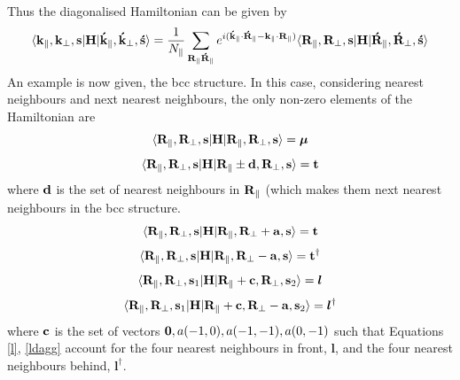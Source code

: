 \documentclass[a4paper, 12pt]{article}
\begin{document}
	Thus the diagonalised Hamiltonian can be given by 
	\begin{equation}
		\langle{\bf k}_\parallel, {\bf k}_\perp, {\bf s}|{\bf H}|{\bf \acute{k}}_\parallel, {\bf \acute{k}}_\perp, {\bf \acute{s}}\rangle = \frac{1}{N_\parallel}\sum_{\bf R_\parallel \acute{R}_\parallel}  e^{i({\bf \acute{k}}_\parallel\cdot {\bf \acute{R}}_\parallel-{\bf k}_\parallel\cdot {\bf R}_\parallel)} \langle{\bf R}_\parallel,{\bf R}_\perp, {\bf s}|{\bf H}|{\bf \acute{R}}_\parallel,{\bf \acute{R}}_\perp, {\bf \acute{s}} \rangle
	\end{equation}
	An example is now given, the \gls{bcc} structure. In this case, considering nearest neighbours and next nearest neighbours, the only non-zero elements of the Hamiltonian are
	\begin{equation}
		\langle{\bf R}_\parallel,{\bf R}_\perp, {\bf s}|{\bf H}|{\bf R}_\parallel,{\bf R}_\perp, {\bf s} \rangle = \bm \mu
	\end{equation}
	\begin{equation}
		\langle{\bf R}_\parallel,{\bf R}_\perp, {\bf s}|{\bf H}|{\bf R}_\parallel \pm {\bf d},{\bf R}_\perp, {\bf s} \rangle = \bf t
	\end{equation} 
	where $\bf d$ is the set of nearest neighbours in $\bf R_\parallel$ (which makes them next nearest neighbours in the \gls{bcc} structure.
	\begin{equation}
		\langle{\bf R}_\parallel,{\bf R}_\perp, {\bf s}|{\bf H}|{\bf R}_\parallel,{\bf R}_\perp+\bf a, {\bf s} \rangle = \bf t
	\end{equation}
	\begin{equation}
		\langle{\bf R}_\parallel,{\bf R}_\perp, {\bf s}|{\bf H}|{\bf R}_\parallel,{\bf R}_\perp-\bf a, {\bf s} \rangle = \bf t^\dagger
	\end{equation}
	\begin{equation}\label{l}
		\langle{\bf R}_\parallel,{\bf R}_\perp, {\bf s}_1|{\bf H}|{\bf R}_\parallel+{\bf c},{\bf R}_\perp, {\bf s}_2 \rangle = \bm l
	\end{equation}
	\begin{equation}\label{ldagg}
		\langle{\bf R}_\parallel,{\bf R}_\perp, {\bf s}_1|{\bf H}|{\bf R}_\parallel+{\bf c},{\bf R}_\perp-{\bf a}, {\bf s}_2 \rangle = \bm{l}^\dagger
	\end{equation}
	where $\bf c$ is the set of vectors ${\bf 0}, a(-1,0), a(-1,-1), a(0,-1)$ such that Equations \eqref{l}, \eqref{ldagg} account for the four nearest neighbours in front, $\bm l$, and the four nearest neighbours behind, $\bm l^\dagger$.
\end{document}
